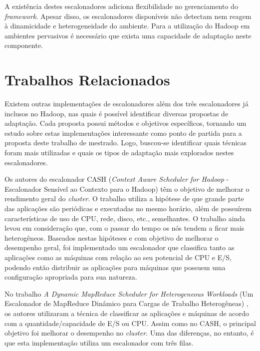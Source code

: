 
A existência destes escalonadores adiciona flexibilidade no gerenciamento do \textit{framework}. Apesar disso, os escalonadores disponíveis não detectam nem reagem à dinamicidade e heterogeneidade do ambiente. Para a utilização do Hadoop em ambientes pervasivos é necessário que exista uma capacidade de adaptação neste componente.





\section{Trabalhos Relacionados}
Existem outras implementações de escalonadores além dos três escalonadores já inclusos no Hadoop, nas quais é possível identificar diversas propostas de adaptação. Cada proposta possui métodos e objetivos específicos, tornando um estudo sobre estas implementações interessante como ponto de partida para a proposta deste trabalho de mestrado. Logo, buscou-se identificar quais técnicas foram mais utilizadas e quais os tipos de adaptação mais explorados nestes escalonadores. 



Os autores do escalonador CASH (\emph{Context Aware Scheduler for Hadoop} - Escalonador Sensível ao Contexto para o Hadoop) \citet{CASH} têm o objetivo de melhorar o rendimento geral do \emph{cluster}. O trabalho utiliza a hipótese de que grande parte das aplicações são periódicas e executadas no mesmo horário, além de possuírem características de uso de CPU, rede, disco, etc., semelhantes. O trabalho ainda levou em consideração que, com o passar do tempo os nós tendem a ficar mais heterogêneos. Baseados nestas hipóteses e com objetivo de melhorar o desempenho geral, foi implementado um escalonador que classifica tanto as aplicações como as máquinas com relação ao seu potencial de CPU e E/S, podendo então distribuir as aplicações para máquinas que possuem uma configuração apropriada para sua natureza.

No trabalho \textit{A Dynamic MapReduce Scheduler for Heterogeneous Workloads} (Um Escalonador de MapReduce Dinâmico para Cargas de Trabalho Heterogêneas) \citet{DMRSHW}, os autores utilizaram a técnica de classificar as aplicações e máquinas de acordo com a quantidade/capacidade de E/S ou CPU. Assim como no CASH, o principal objetivo foi melhorar o desempenho no \textit{cluster}. Uma das diferenças, no entanto, é que esta implementação utiliza um escalonador com três filas.

